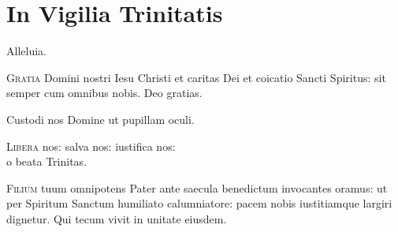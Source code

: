 \chapter{In Vigilia Trinitatis}

Alleluia.

\lettrine{G}{ratia} Domini nostri Iesu Christi
et caritas Dei et coicatio Sancti Spiritus:
sit semper cum omnibus nobis. %
Deo gratias.


Custodi nos Domine ut pupillam oculi.

\lettrine{L}{ibera} nos: salva nos: iustifica nos:\\ %
o beata Trinitas.


\lettrine{F}{ilium} tuum omnipotens Pater
ante saecula benedictum invocantes oramus:
ut per Spiritum Sanctum humiliato calumniatore:
pacem nobis iustitiamque largiri dignetur.
Qui tecum vivit in unitate eiusdem.


\headingCantus

